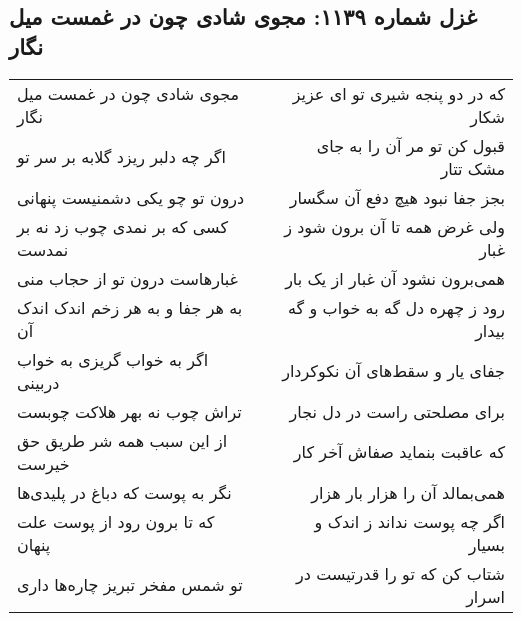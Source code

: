 \begin{center}
\section*{غزل شماره ۱۱۳۹: مجوی شادی چون در غمست میل نگار}
\label{sec:1139}
\begin{longtable}{l p{0.5cm} r}
مجوی شادی چون در غمست میل نگار
&&
که در دو پنجه شیری تو ای عزیز شکار
\\
اگر چه دلبر ریزد گلابه بر سر تو
&&
قبول کن تو مر آن را به جای مشک تتار
\\
درون تو چو یکی دشمنیست پنهانی
&&
بجز جفا نبود هیچ دفع آن سگسار
\\
کسی که بر نمدی چوب زد نه بر نمدست
&&
ولی غرض همه تا آن برون شود ز غبار
\\
غبارهاست درون تو از حجاب منی
&&
همی‌برون نشود آن غبار از یک بار
\\
به هر جفا و به هر زخم اندک اندک آن
&&
رود ز چهره دل گه به خواب و گه بیدار
\\
اگر به خواب گریزی به خواب دربینی
&&
جفای یار و سقط‌های آن نکوکردار
\\
تراش چوب نه بهر هلاکت چوبست
&&
برای مصلحتی راست در دل نجار
\\
از این سبب همه شر طریق حق خیرست
&&
که عاقبت بنماید صفاش آخر کار
\\
نگر به پوست که دباغ در پلیدی‌ها
&&
همی‌بمالد آن را هزار بار هزار
\\
که تا برون رود از پوست علت پنهان
&&
اگر چه پوست نداند ز اندک و بسیار
\\
تو شمس مفخر تبریز چاره‌ها داری
&&
شتاب کن که تو را قدرتیست در اسرار
\\
\end{longtable}
\end{center}
